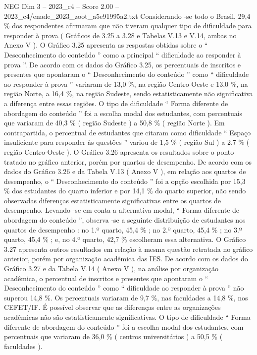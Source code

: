 \begin{textsample}{NEG Dim 3 – 2023\_c4 – Score 2.00 – 2023\_c4/enade\_2023\_zoot\_a5e91995a2.txt}
Considerando -se todo o Brasil, 29,4 \% dos respondentes afirmaram que não tiveram qualquer tipo de dificuldade para responder à prova ( Gráficos de 3.25 a 3.28 e Tabelas V.13 e V.14, ambas no Anexo V ).
O Gráfico 3.25 apresenta as respostas obtidas sobre o “ Desconhecimento do conteúdo ” como a principal “ dificuldade ao responder à prova ”.
De acordo com os dados do Gráfico 3.25, os percentuais de inscritos e presentes que apontaram o “ Desconhecimento do conteúdo ” como “ dificuldade ao responder à prova ” variaram de 13,0 \%, na região Centro-Oeste e 13,0 \%, na região Norte, a 16,4 \%, na região Sudeste, sendo estatisticamente não significativa a diferença entre essas regiões.
O tipo de dificuldade “ Forma diferente de abordagem do conteúdo ” foi a escolha modal dos estudantes, com percentuais que variaram de 40,3 \% ( região Sudeste ) a 50,8 \% ( região Norte ).
Em contrapartida, o percentual de estudantes que citaram como dificuldade “ Espaço insuficiente para responder às questões ” variou de 1,5 \% ( região Sul ) a 2,7 \% ( região Centro-Oeste ).
O Gráfico 3.26 apresenta os resultados sobre o ponto tratado no gráfico anterior, porém por quartos de desempenho.
De acordo com os dados do Gráfico 3.26 e da Tabela V.13 ( Anexo V ), em relação aos quartos de desempenho, o “ Desconhecimento do conteúdo ” foi a opção escolhida por 15,3 \% dos estudantes do quarto inferior e por 14,1 \% do quarto superior, não sendo observadas diferenças estatisticamente significativas entre os quartos de desempenho.
Levando -se em conta a alternativa modal, “ Forma diferente de abordagem do conteúdo ”, observa -se a seguinte distribuição de estudantes nos quartos de desempenho : no 1.º quarto, 45,4 \% ; no 2.º quarto, 45,4 \% ; no 3.º quarto, 45,4 \% ; e, no 4.º quarto, 42,7 \% escolheram essa alternativa.
O Gráfico 3.27 apresenta outros resultados em relação à mesma questão retratada no gráfico anterior, porém por organização acadêmica das IES.
De acordo com os dados do Gráfico 3.27 e da Tabela V.14 ( Anexo V ), na análise por organização acadêmica, o percentual de inscritos e presentes que apontaram o “ Desconhecimento do conteúdo ” como “ dificuldade ao responder à prova ” não superou 14,8 \%.
Os percentuais variaram de 9,7 \%, nas faculdades a 14,8 \%, nos CEFET/IF.
É possível observar que as diferenças entre as organizações acadêmicas não são estatisticamente significativas.
O tipo de dificuldade “ Forma diferente de abordagem do conteúdo ” foi a escolha modal dos estudantes, com percentuais que variaram de 36,0 \% ( centros universitários ) a 50,5 \% ( faculdades ).

\end{textsample}
